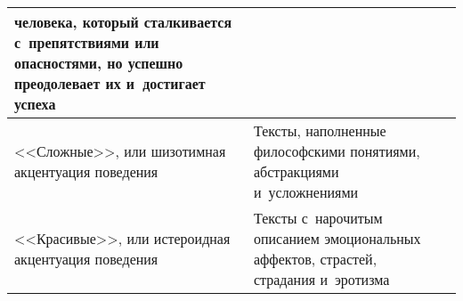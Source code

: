 \begin{table*}
\begin{center}
\begin{tabular}{|p{30mm}|p{67mm}|p{53mm}|}
{человека, который  сталкивается  с~препятствиями или 
опасностями, но успешно  преодолевает их 
и~достигает успеха} &
\\
\hline
<<Сложные>>,  или шизотимная  акцентуация поведения &
{Тексты, наполненные  философскими понятиями, 
абстракциями  и~усложнениями} &\\
\hline
<<Красивые>>,  или истероидная  акцентуация поведения&
{Тексты с~нарочитым описанием эмоциональных 
аффектов, страстей,  страдания и~эротизма} &
\\
\hline
\end{tabular}
\end{center}
\vspace*{-24pt}
\end{table*}

\pagebreak



